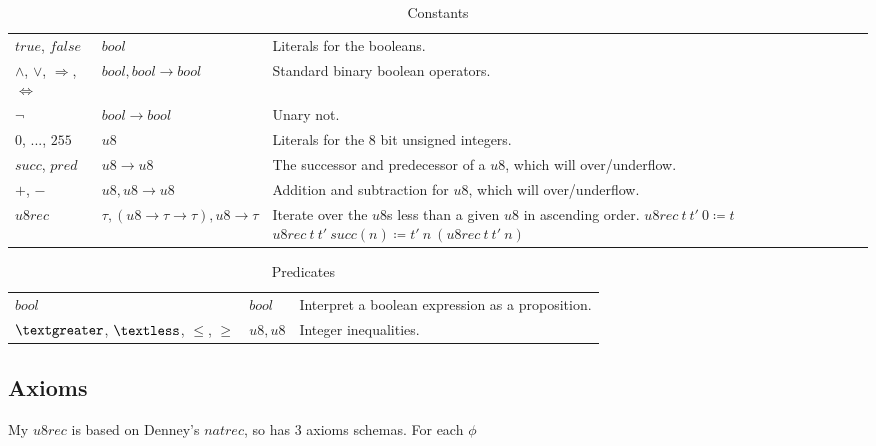 \documentclass[12pt,a4paper,titlepage]{article}
\begin{document}
    \begin{table}
        \begin{tabular}{|l|l|p{}|}
            \cline{1-3}
            $true$, $false$ & $bool$ & Literals for the booleans.\\\cline{1-3}
            $\land$, $\lor$, $\Rightarrow$, $\Leftrightarrow$ & $bool, bool \rightarrow bool$ & Standard binary boolean operators.\\\cline{1-3}
            $\lnot$ & $bool \rightarrow bool$ & Unary not.\\\cline{1-3}
            $0$, ..., $255$ & $u8$ & Literals for the 8 bit unsigned integers.\\\cline{1-3}
            $succ$, $pred$ & $u8 \rightarrow u8$ & The successor and predecessor of a $u8$, which will over/underflow.\\\cline{1-3}
            $+$, $-$ & $u8, u8 \rightarrow u8$ & Addition and subtraction for $u8$, which will over/underflow.\\\cline{1-3}
            $u8rec$ & $\tau, (u8 \rightarrow \tau \rightarrow \tau), u8 \rightarrow \tau$ &
            Iterate over the $u8$s less than a given $u8$ in ascending order.\newline
            $u8rec\ t\ t'\ 0 \coloneqq t$ \newline
            $u8rec\ t\ t'\ succ(n) \coloneqq t'\ n\ (u8rec\ t\ t'\ n)$\\\cline{1-3}
        \end{tabular}
        \caption{Constants}
        \label{tab:constants}
    \end{table}

    \begin{table}
        \begin{tabular}{|l|l|p{}|}
            \cline{1-3}
            $bool$ & $bool$ & Interpret a boolean expression as a proposition.\\\cline{1-3}
            $\textgreater$, $\textless$, $\leq$, $\geq$ & $u8, u8$ & Integer inequalities.\\\cline{1-3}
        \end{tabular}
        \caption{Predicates}
        \label{tab:predicates}
    \end{table}

    \subsection{Axioms}
    My $u8rec$ is based on Denney's $natrec$, so has 3 axioms schemas. For each $\phi$
\end{document}

